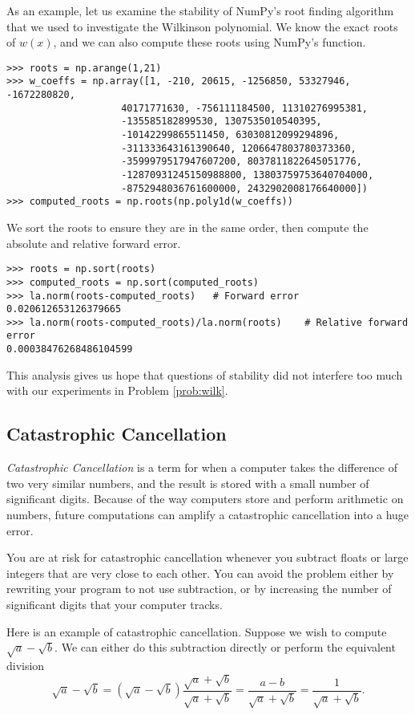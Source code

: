 As an example, let us examine the stability of NumPy's root finding algorithm that we used to investigate the Wilkinson polynomial.
We know the exact roots of $w(x)$, and we can also compute these roots using NumPy's  function.
\begin{lstlisting}
>>> roots = np.arange(1,21)
>>> w_coeffs = np.array([1, -210, 20615, -1256850, 53327946, -1672280820,
                    40171771630, -756111184500, 11310276995381,
                    -135585182899530, 1307535010540395,
                    -10142299865511450, 63030812099294896,
                    -311333643161390640, 1206647803780373360,
                    -3599979517947607200, 8037811822645051776,
                    -12870931245150988800, 13803759753640704000,
                    -8752948036761600000, 2432902008176640000])
>>> computed_roots = np.roots(np.poly1d(w_coeffs))
\end{lstlisting}
We sort the roots to ensure they are in the same order, then compute the absolute and relative forward error.
\begin{lstlisting}
>>> roots = np.sort(roots)
>>> computed_roots = np.sort(computed_roots)
>>> la.norm(roots-computed_roots)	# Forward error
0.020612653126379665
>>> la.norm(roots-computed_roots)/la.norm(roots)	# Relative forward error
0.00038476268486104599
\end{lstlisting}

This analysis gives us hope that questions of stability did not interfere too much with our experiments in Problem \ref{prob:wilk}.

\subsection*{Catastrophic Cancellation}
\emph{Catastrophic Cancellation} is a term for when a computer takes the difference of two very similar numbers, and the result is stored with a small number of significant digits.
Because of the way computers store and perform arithmetic on numbers, future computations can amplify a catastrophic cancellation into a huge error.

You are at risk for catastrophic cancellation whenever you subtract floats or large integers that are very close to each other.
You can avoid the problem either by rewriting your program to not use subtraction, or by increasing the number of significant digits that your computer tracks.

Here is an example of catastrophic cancellation.
Suppose we wish to compute $\sqrt{a}-\sqrt{b}$. We can either do this subtraction directly or perform the equivalent division
\[
\sqrt{a}-\sqrt{b} = (\sqrt{a}-\sqrt{b})\frac{\sqrt{a}+\sqrt{b}}{\sqrt{a}+\sqrt{b}} = \frac{a-b}{\sqrt{a}+\sqrt{b}}=\frac{1}{\sqrt{a}+\sqrt{b}}.
\]

